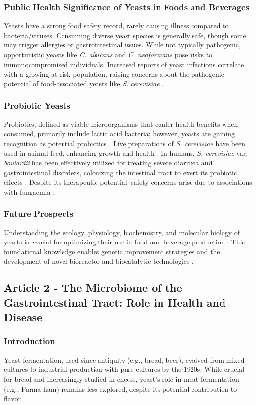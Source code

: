 \subsubsection*{Public Health Significance of Yeasts in Foods and Beverages}
Yeasts have a strong food safety record, rarely causing illness compared to bacteria/viruses. Consuming diverse yeast species is generally safe, though some may trigger allergies or gastrointestinal issues. While not typically pathogenic, opportunistic yeasts like \textit{C. albicans} and \textit{C. neoformans} pose risks to immunocompromised individuals. Increased reports of yeast infections correlate with a growing at-risk population, raising concerns about the pathogenic potential of food-associated yeasts like \textit{S. cerevisiae} \cite*{L6-Yeasts}.

\subsubsection*{Probiotic Yeasts}
Probiotics, defined as viable microorganisms that confer health benefits when consumed, primarily include lactic acid bacteria; however, yeasts are gaining recognition as potential probiotics \cite*{L6-Yeasts}. Live preparations of \textit{S. cerevisiae} have been used in animal feed, enhancing growth and health \cite*{L6-Yeasts}. In humans, \textit{S. cerevisiae} var. \textit{boulardii} has been effectively utilized for treating severe diarrhea and gastrointestinal disorders, colonizing the intestinal tract to exert its probiotic effects \cite*{L6-Yeasts}. Despite its therapeutic potential, safety concerns arise due to associations with fungaemia \cite*{L6-Yeasts}.

\subsubsection*{Future Prospects}
Understanding the ecology, physiology, biochemistry, and molecular biology of yeasts is crucial for optimizing their use in food and beverage production \cite*{L6-Yeasts}. This foundational knowledge enables genetic improvement strategies and the development of novel bioreactor and biocatalytic technologies \cite*{L6-Yeasts}. 

\subsection{Article 2 -  The Microbiome of the Gastrointestinal Tract: Role in Health and Disease}
\subsubsection*{Introduction}
Yeast fermentation, used since antiquity (e.g., bread, beer), evolved from mixed cultures to industrial production with pure cultures by the 1920s. While crucial for bread and increasingly studied in cheese, yeast's role in meat fermentation (e.g., Parma ham) remains less explored, despite its potential contribution to flavor \cite*{L6-Yeasts}.

